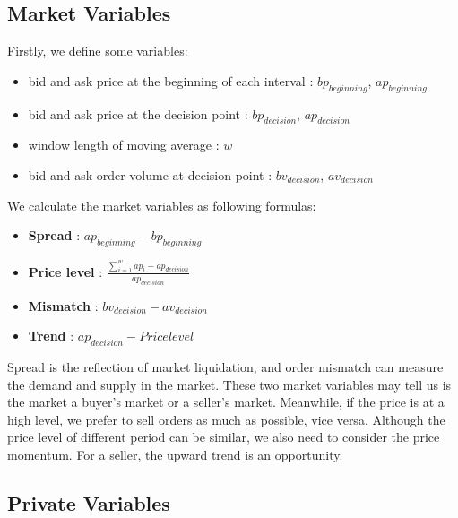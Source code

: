 \documentclass[12pt]{extarticle}
\begin{document}
\subsection{Market Variables} \label{market-variables}

Firstly, we define some variables:
\begin{itemize}
  \item bid and ask price at the beginning of each interval : $bp_{beginning}$, $ap_{beginning}$
  \item bid and ask price at the decision point : $bp_{decision}$, $ap_{decision}$
  \item window length of moving average : $w$
  \item bid and ask order volume at decision point : $bv_{decision}$, $av_{decision}$
\end{itemize}
We calculate the market variables as following formulas:
\begin{itemize}
\item \textbf{Spread} : $ap_{beginning} - bp_{beginning}$
\item \textbf{Price level} : $\frac{\sum_{i=1}^{w}ap_i - ap_{decision}}{ap_{decision}}$
\item \textbf{Mismatch} : $bv_{decision} - av_{decision}$
\item \textbf{Trend} : $ap_{decision} - Price level$
\end{itemize}

\noindent Spread is the reflection of market liquidation, and order mismatch can measure the demand and supply in the market. These two market variables may tell us is the market a buyer's market or a seller's market. Meanwhile, if the price is at a high level, we prefer to sell orders as much as possible, vice versa. Although the price level of different period can be similar, we also need to consider the price momentum. For a seller, the upward trend is an opportunity.
\subsection{Private Variables} \label{private-variables}
\end{document}
